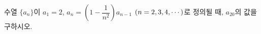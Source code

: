 수열 $\{a_n\}$이 $a_1=2$, $a_n=\left(1-\dfrac{1}{n^2}\right)a_{n-1}$ $(n=2{,}\mkern3mu\mathopen{}3{,}\mkern3mu\mathopen{}4{,}\mkern3mu\mathopen{}\cdots)$로 정의될 때, $a_{20}$의 값을 구하시오.
